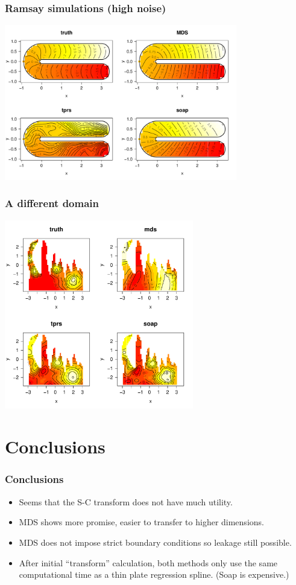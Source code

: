\documentclass[ignorenonframetext]{beamer} %
\newcommand{\bi}{\begin{itemize}}
\newcommand{\ei}{\end{itemize}}
\begin{document}
\begin{frame}
	\frametitle{Ramsay simulations (high noise)}
            \centering
              \includegraphics[width=4in]{figs/ramsay-high.pdf}\\
\end{frame}

\begin{frame}
	\frametitle{A different domain}
            \centering
              \includegraphics[width=3.25in]{figs/wt2-real.pdf}\\
\end{frame}

\section{Conclusions}

\begin{frame}
	\frametitle{Conclusions}
       \bi
         \item Seems that the S-C transform does not have much utility.
         \item MDS shows more promise, easier to transfer to higher dimensions.
         \item MDS does not impose strict boundary conditions so leakage still possible.
         \item After initial ``transform'' calculation, both methods only use the same computational time as a thin plate regression spline. (Soap is expensive.)
        \ei
\end{frame}
\end{document}
